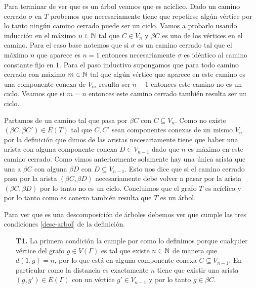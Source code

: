 \documentclass[tesis.tex]{subfiles}
\begin{document}
\begin{ej}
	Para terminar de ver que es un árbol veamos que es acíclico. 
	Dado un camino cerrado $\sigma$ en $T$ probemos que necesariamente tiene que repetirse algún vértice por lo tanto ningún camino cerrado puede ser un ciclo. Vamos a probarlo usando inducción en el máximo $n \in \mathbb{N}$ tal que $C \in V_n$ y $\beta C$ es uno de los vértices en el camino. 
	Para el caso base notemos que si $\sigma$ es un camino cerrado tal que el máximo $n$ que aparece es $n=1$ entonces necesariamente $\sigma$ es idéntico al camino constante fijo en $1$.
	Para el paso inductivo supongamos que para todo camino cerrado con máximo $m \in \mathbb{N}$ tal que algún vértice que aparece en este camino es una componente conexa de $V_m$ resulta ser $n-1$ entonces este camino no es un ciclo. Veamos que si $m=n$ entonces este camino cerrado también resulta ser un ciclo.
	
	Partamos de un camino tal que pasa por $\beta C$ con $C \subseteq V_n$. 
	Como no existe $(\beta C, \beta C') \in E(T)$ tal que $C,C'$ sean componentes conexas de un mismo $V_n$ por la definición que dimos de las aristas necesariamente tiene que haber una arista con alguna componente conexa $D \in V_{n-1}$ dado que $n$ es máximo en este camino cerrado.   
	Como vimos anteriormente solamente hay una única arista que una a $\beta C$ con alguna $\beta D$ con $D \subseteq V_{n-1}$. 
	Esto nos dice que si el camino cerrado pasa por la arista $(\beta C, \beta D)$ necesariamente debe volver a pasar por la arista $(\beta C, \beta D)$ por lo tanto no es un ciclo. 
	Concluimos que el grafo $T$ es acíclico y por lo tanto como es conexo también resulta que $T$ es un árbol.
	
	Para ver que es una descomposición de árboles debemos ver que cumple las tres condiciones \ref{desc-arbol} de la definición. 
	\begin{enumerate}
		\item[\textbf{T1.}] La primera condición la cumple por como lo definimos porque cualquier vértice del grafo $g \in V(\Gamma)$ 
		es tal que existe $n \in \mathbb{N}$ de manera que $d(1,g)=n$, por lo que está en alguna componente conexa $C \subseteq V_{n-1}$. 
		En particular como la distancia es exactamente $n$ tiene que existir una arista $(g,g') \in E(\Gamma)$ con un vértice $g' \in V_{n-1}$ y por lo tanto $g \in \beta C$.
		

\end{enumerate}
\end{ej}
\end{document}
